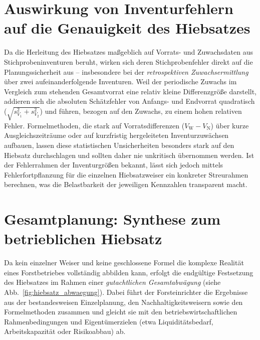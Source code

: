 \documentclass[twocolumn, paper=a4, fontsize=10pt]{scrartcl}
\begin{document}
\section{Auswirkung von Inventurfehlern auf die Genauigkeit des Hiebsatzes}

Da die Herleitung des Hiebsatzes maßgeblich auf Vorrats- und Zuwachsdaten aus Stichprobeninventuren beruht, wirken sich deren Stichprobenfehler direkt auf die Planungssicherheit aus -- insbesondere bei der \emph{retrospektiven Zuwachsermittlung} über zwei aufeinanderfolgende Inventuren. Weil der periodische Zuwachs im Vergleich zum stehenden Gesamtvorrat eine relativ kleine Differenzgröße darstellt, addieren sich die absoluten Schätzfehler von Anfangs- und Endvorrat quadratisch ($\sqrt{s_{V_1}^2 + s_{V_2}^2}$) und führen, bezogen auf den Zuwachs, zu einem hohen relativen Fehler. Formelmethoden, die stark auf Vorratsdifferenzen ($V_{\text{W}} - V_{\text{N}}$) über kurze Ausgleichszeiträume oder auf kurzfristig hergeleiteten Inventurzuwächsen aufbauen, lassen diese statistischen Unsicherheiten besonders stark auf den Hiebsatz durchschlagen und sollten daher nie unkritisch übernommen werden. Ist der Fehlerrahmen der Inventurgrößen bekannt, lässt sich jedoch mittels Fehlerfortpflanzung für die einzelnen Hiebsatzweiser ein konkreter Streurahmen berechnen, was die Belastbarkeit der jeweiligen Kennzahlen transparent macht.

\section{Gesamtplanung: Synthese zum betrieblichen Hiebsatz}

Da kein einzelner Weiser und keine geschlossene Formel die komplexe Realität eines Forstbetriebes vollständig abbilden kann, erfolgt die endgültige Festsetzung des Hiebsatzes im Rahmen einer \emph{gutachtlichen Gesamtabwägung} (siehe Abb.~\ref{fig:hiebsatz_abwaegung}). Dabei führt der Forsteinrichter die Ergebnisse aus der bestandesweisen Einzelplanung, den Nachhaltigkeitsweisern sowie den Formelmethoden zusammen und gleicht sie mit den betriebswirtschaftlichen Rahmenbedingungen und Eigentümerzielen (etwa Liquiditätsbedarf, Arbeitskapazität oder Risikoabbau) ab.
\end{document}
